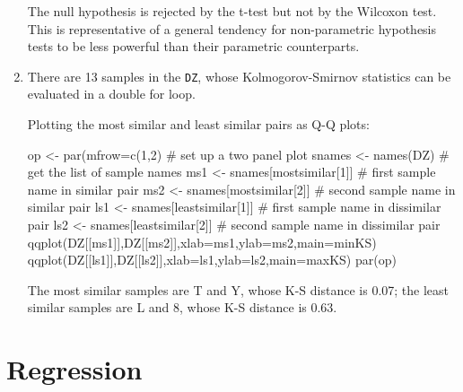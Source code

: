 \begin{enumerate}
The null hypothesis is rejected by the t-test but not by the Wilcoxon
test. This is representative of a general tendency for non-parametric
hypothesis tests to be less powerful than their parametric
counterparts.
  
\item\label{it:sol-DZ-MDS} There are 13 samples in the \texttt{DZ},
  whose Kolmogorov-Smirnov statistics can be evaluated in a double for
  loop.


Plotting the most similar and least similar pairs as Q-Q plots:

\begin{script}[firstnumber=17]
op <- par(mfrow=c(1,2)          # set up a two panel plot
snames <- names(DZ)             # get the list of sample names
ms1 <- snames[mostsimilar[1]]   # first sample name in similar pair
ms2 <- snames[mostsimilar[2]]   # second sample name in similar pair
ls1 <- snames[leastsimilar[1]]  # first sample name in dissimilar pair
ls2 <- snames[leastsimilar[2]]  # second sample name in dissimilar pair
qqplot(DZ[[ms1]],DZ[[ms2]],xlab=ms1,ylab=ms2,main=minKS)
qqplot(DZ[[ls1]],DZ[[ls2]],xlab=ls1,ylab=ls2,main=maxKS)
par(op)
\end{script}

The most similar samples are T and Y, whose K-S distance is 0.07; the
least similar samples are L and 8, whose K-S distance is 0.63.

\end{enumerate}

\section{Regression}
\label{sec:sol-regression}

